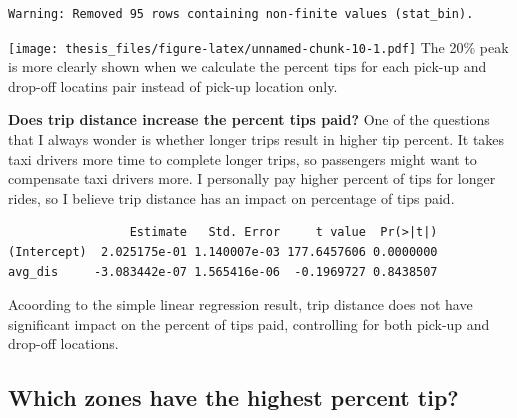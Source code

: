 \documentclass[12pt,twoside]{reedthesis}
\newenvironment{Shaded}{\begin{snugshade}}{\end{snugshade}}
\newcommand{\KeywordTok}[1]{\textcolor[rgb]{0.13,0.29,0.53}{\textbf{#1}}}
\newcommand{\DataTypeTok}[1]{\textcolor[rgb]{0.13,0.29,0.53}{#1}}
\newcommand{\DecValTok}[1]{\textcolor[rgb]{0.00,0.00,0.81}{#1}}
\newcommand{\StringTok}[1]{\textcolor[rgb]{0.31,0.60,0.02}{#1}}
\newcommand{\OperatorTok}[1]{\textcolor[rgb]{0.81,0.36,0.00}{\textbf{#1}}}
\newcommand{\NormalTok}[1]{#1}
\theoremstyle{definition}
\theoremstyle{definition}
\theoremstyle{definition}
\theoremstyle{remark}
\begin{document}
\begin{verbatim}
Warning: Removed 95 rows containing non-finite values (stat_bin).
\end{verbatim}
\texttt{[image: thesis\_files/figure-latex/unnamed-chunk-10-1.pdf]} The
20\% peak is more clearly shown when we calculate the percent tips for
each pick-up and drop-off locatins pair instead of pick-up location
only.

\textbf{Does trip distance increase the percent tips paid?} One of the
questions that I always wonder is whether longer trips result in higher
tip percent. It takes taxi drivers more time to complete longer trips,
so passengers might want to compensate taxi drivers more. I personally
pay higher percent of tips for longer rides, so I believe trip distance
has an impact on percentage of tips paid.
\begin{Shaded}
\end{Shaded}
\begin{verbatim}
                 Estimate   Std. Error     t value  Pr(>|t|)
(Intercept)  2.025175e-01 1.140007e-03 177.6457606 0.0000000
avg_dis     -3.083442e-07 1.565416e-06  -0.1969727 0.8438507
\end{verbatim}
Acoording to the simple linear regression result, trip distance does not
have significant impact on the percent of tips paid, controlling for
both pick-up and drop-off locations.

\subsection{Which zones have the highest percent
tip?}\label{which-zones-have-the-highest-percent-tip}
\end{document}
